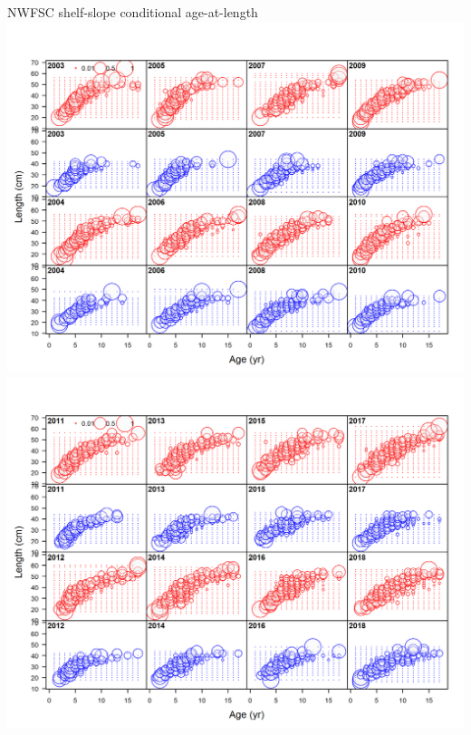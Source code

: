 \documentclass[pdf]{beamer}\usepackage[]{graphicx}\usepackage[]{color}
\begin{document}
\begin{frame}{NWFSC shelf-slope conditional age-at-length}
    \includegraphics[scale = 0.42]{r4ss/comp_condAALdat_bubflt7mkt0_page1.png}
    \includegraphics[scale = 0.42]{r4ss/comp_condAALdat_bubflt7mkt0_page2.png}
\end{frame}
\end{document}
